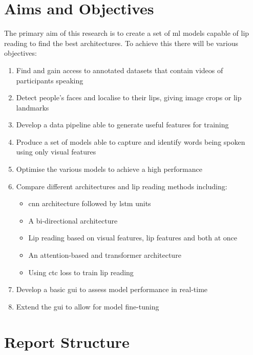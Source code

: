 \section{Aims and Objectives}
\label{sec:Aims and Objectives}
The primary aim of this research is to create a set of \acrshort{ml} models capable of lip reading to find the best architectures. To achieve this there will be various objectives:\\
\begin{enumerate}
  \item Find and gain access to annotated datasets that contain videos of participants speaking
  \item Detect people's faces and localise to their lips, giving image crops or lip landmarks
  \item Develop a data pipeline able to generate useful features for training
  \item Produce a set of models able to capture and identify words being spoken using only visual features
  \item Optimise the various models to achieve a high performance
  \item Compare different architectures and lip reading methods including:
    \begin{itemize}
        \item \acrshort{cnn} architecture followed by \acrshort{lstm} units
        \item A bi-directional architecture
        \item Lip reading based on visual features, lip features and both at once
        \item An attention-based and \gls{transformer} architecture
        \item Using \acrshort{ctc} loss to train lip reading
    \end{itemize} 
  \item Develop a basic \acrfull{gui} to assess model performance in real-time
  \item Extend the \acrshort{gui} to allow for model \gls{fine-tuning}
\end{enumerate}

\section{Report Structure}

